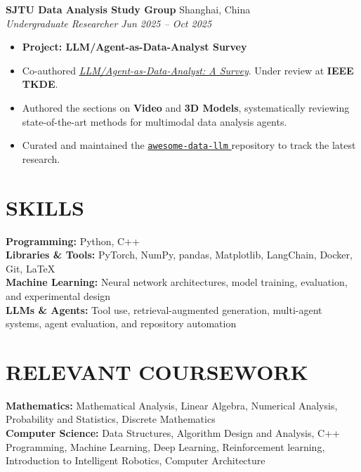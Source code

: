 \documentclass[a4paper,11pt]{article}
\newcommand{\paperlink}[2]{\href{#1}{\uline{#2}}}
\newcommand{\resheading}[1]{\section*{#1}}
\begin{document}
\textbf{SJTU Data Analysis Study Group}
\hfill Shanghai, China \\
\emph{Undergraduate Researcher}
\hfill \emph{Jun 2025 -- Oct 2025}
\begin{itemize}
    \item \textbf{Project: LLM/Agent-as-Data-Analyst Survey}
    \item Co-authored
    \paperlink{https://arxiv.org/abs/2509.23988}{%
        \emph{LLM/Agent-as-Data-Analyst: A Survey}}.
    Under review at \textbf{IEEE TKDE}.
    \item Authored the sections on \textbf{Video} and
    \textbf{3D Models}, systematically reviewing
    state-of-the-art methods for multimodal data analysis agents.
    \item Curated and maintained the
    \href{https://github.com/weAIDB/awesome-data-llm}{
        \texttt{awesome-data-llm}
    } repository to track the latest research.
\end{itemize}

\resheading{SKILLS}

\textbf{Programming:} Python, C++ \\
\textbf{Libraries \& Tools:} PyTorch, NumPy, pandas,
Matplotlib, LangChain, Docker, Git, \LaTeX \\
\textbf{Machine Learning:} Neural network architectures,
model training, evaluation, and experimental design \\
\textbf{LLMs \& Agents:} Tool use, retrieval-augmented generation,
multi-agent systems, agent evaluation, and repository automation

\resheading{RELEVANT COURSEWORK}

\textbf{Mathematics:} Mathematical Analysis, Linear Algebra,
Numerical Analysis, Probability and Statistics, Discrete Mathematics \\
\textbf{Computer Science:} Data Structures,
Algorithm Design and Analysis, C++ Programming,
Machine Learning, Deep Learning, Reinforcement learning, Introduction to Intelligent Robotics, Computer Architecture
\end{document}
